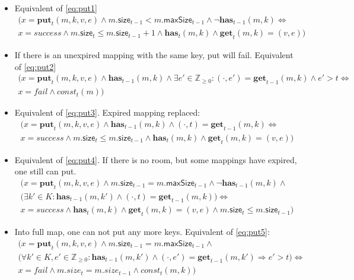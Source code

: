\documentclass{article}
\renewcommand{\o}[1]{\ensuremath{\mathbf{#1}}}
\newcommand{\p}[1]{\ensuremath{\mathit{#1}}}
\newcommand{\s}[1]{\ensuremath{\mathsf{#1}}}
\newcommand{\nintset}{\ensuremath{\mathds{Z}_{\ge 0}}}
\begin{document}
\begin{itemize}
\item Equivalent of \eqref{eq:put1}
  \begin{gather*}
    \Big(x=\o{put}_t(m, k, v, e) \wedge m.\s{size}_{t-1} < m.\s{maxSize}_{t-1} \wedge \neg\o{has}_{t-1}(m, k) \Leftrightarrow \nonumber\\
    x=success \wedge m.\s{size}_t \le m.\s{size}_{t-1}+1 \wedge \o{has}_t(m, k)\wedge\o{get}_t(m, k) = (v, e)\Big)
  \end{gather*}

\item If there is an unexpired mapping with the same key, put will fail. Equivalent of \eqref{eq:put2}
  \begin{gather*}
    \Big(x=\o{put}_t(m, k, v, e) \wedge \o{has}_{t-1}(m, k) \wedge \exists e'\in \nintset: (\cdot, e')=\o{get}_{t-1}(m, k) \wedge e' > t \Leftrightarrow\\
    x=fail \wedge \p{const}_t(m)\Big)
  \end{gather*}

\item Equivalent of \eqref{eq:put3}. Expired mapping replaced:
  \begin{gather*}
    \Big(x=\o{put}_t(m, k, v, e) \wedge \o{has}_{t-1}(m, k) \wedge (\cdot, t)=\o{get}_{t-1}(m, k) \Leftrightarrow\\
    x=success \wedge m.\s{size}_t \le m.\s{size}_{t-1} \wedge \o{has}_t(m, k)\wedge\o{get}_t(m, k) = (v, e)\Big)
  \end{gather*}

\item Equivalent of \eqref{eq:put4}. If there is no room, but some mappings have expired, one still can put.
  \begin{gather*}
    \Big(x=\o{put}_t(m, k, v, e) \wedge m.\s{size}_{t-1} = m.\s{maxSize}_{t-1} \wedge \neg\o{has}_{t-1}(m, k) \wedge\\
    \big(\exists k'\in K: \o{has}_{t-1}(m,k')\wedge (\cdot,t)=\o{get}_{t-1}(m, k) \big) \Leftrightarrow\\
    x=success \wedge \o{has}_t(m, k)\wedge\o{get}_t(m, k) = (v, e) \wedge m.\s{size}_t \le m.\s{size}_{t-1}\Big)
\end{gather*}

\item Into full map, one can not put any more keys. Equivalent of \eqref{eq:put5}:
  \begin{gather*}
    \Big(x=\o{put}_t(m, k, v, e) \wedge m.\s{size}_{t-1} = m.\s{maxSize}_{t-1} \wedge  \\
    \big(\forall k'\in K,e'\in \nintset :\o{has}_{t-1}(m, k')\wedge(\cdot,e')=\o{get}_{t-1}(m,k') \Rightarrow e' > t \big) \Leftrightarrow\\
    x=fail \wedge m.size_t = m.size_{t-1} \wedge \p{const}_t(m, k)\Big)
  \end{gather*}


\end{itemize}
\end{document}
